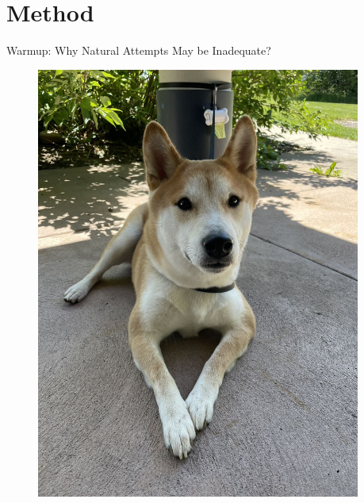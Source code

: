 \documentclass[10pt, xcolor=x11names,compress]{beamer}
\begin{document}
\section{Method}
\begin{frame}[label=Rocky]{Warmup: Why Natural Attempts May be Inadequate?}
\begin{figure}
 \begin{columns}[c]
  \begin{column}{0.3\textwidth}
    \centering
    \includegraphics[width=1\textwidth]{Figure2.jpg}
  \end{column}
  \begin{column}{0.3\textwidth}
    \centering

\end{column}
\end{columns}
\end{figure}
\end{frame}
\end{document}
